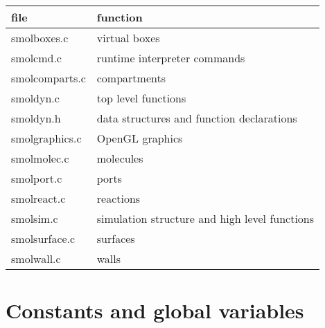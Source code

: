 \documentclass {book}
\begin{document}
\begin{longtable}[c]{ll}
file & function\\
\hline
smolboxes.c & virtual boxes\\
smolcmd.c & runtime interpreter commands\\
smolcomparts.c & compartments\\
smoldyn.c & top level functions\\
smoldyn.h & data structures and function declarations\\
smolgraphics.c & OpenGL graphics\\
smolmolec.c & molecules\\
smolport.c & ports\\
smolreact.c & reactions\\
smolsim.c & simulation structure and high level functions\\
smolsurface.c & surfaces\\
smolwall.c & walls\\
\end{longtable}

\section{Constants and global variables}
\end{document}
